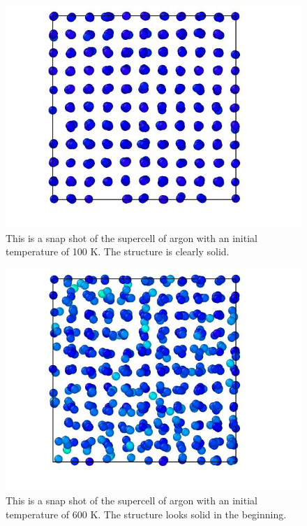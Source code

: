 \begin{multicols}{2}

\begin{figure}[H]
\includegraphics[width=\linewidth]{../figures/solid_100}\caption{This is a snap shot of the supercell of argon with an initial temperature of 100 K. The structure is clearly solid.}\label{fig:solid_100K}
\end{figure}

\begin{figure}[H]
\includegraphics[width=\linewidth]{../figures/solid_600}\caption{This is a snap shot of the supercell of argon with an initial temperature of 600 K. The structure looks solid in the beginning.}\label{fig:solid_600K}
\end{figure}


\end{multicols}
